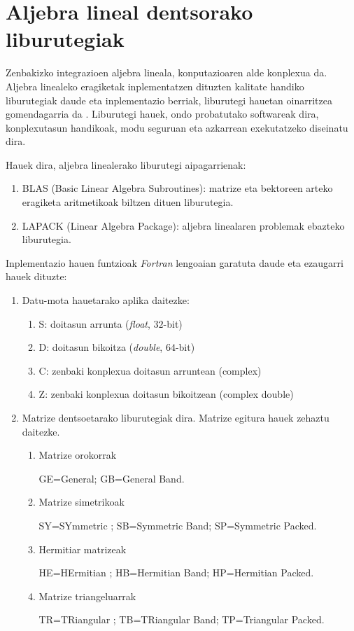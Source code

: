    
\section{Aljebra lineal dentsorako liburutegiak}


Zenbakizko integrazioen aljebra lineala, konputazioaren alde konplexua da. Aljebra linealeko eragiketak inplementatzen dituzten kalitate handiko liburutegiak daude eta inplementazio berriak, liburutegi hauetan oinarritzea gomendagarria da \cite{Hogben2013}. Liburutegi hauek, ondo probatutako softwareak dira, konplexutasun handikoak, modu seguruan eta azkarrean exekutatzeko diseinatu dira.

Hauek dira, aljebra linealerako liburutegi aipagarrienak:
\begin{enumerate}
\item BLAS (Basic Linear Algebra Subroutines): matrize eta bektoreen arteko eragiketa aritmetikoak biltzen dituen liburutegia. 
\item LAPACK (Linear Algebra Package): aljebra linealaren problemak ebazteko liburutegia.
\end{enumerate}


Inplementazio hauen funtzioak \emph{Fortran} lengoaian garatuta daude eta ezaugarri hauek dituzte:
\begin{enumerate}
\item Datu-mota hauetarako aplika daitezke:
\begin{enumerate}
\item S: doitasun arrunta (\emph{float}, $32$-bit)
\item D: doitasun bikoitza (\emph{double}, $64$-bit)
\item C: zenbaki konplexua doitasun arruntean (complex)
\item Z: zenbaki konplexua doitasun bikoitzean (complex double)
\end{enumerate}  

\item Matrize dentsoetarako liburutegiak dira. Matrize egitura hauek zehaztu daitezke.
\begin{enumerate}
\item Matrize orokorrak

 GE=General; GB=General Band.
\item Matrize simetrikoak

 SY=SYmmetric ; SB=Symmetric Band; SP=Symmetric Packed.
\item Hermitiar matrizeak

 HE=HErmitian ; HB=Hermitian Band; HP=Hermitian Packed.
\item Matrize triangeluarrak

 TR=TRiangular ; TB=TRiangular Band; TP=Triangular Packed.
\end{enumerate}

\end{enumerate}   

